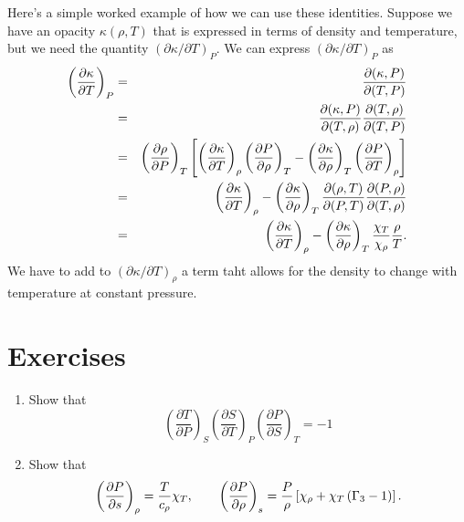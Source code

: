 Here's a simple worked example of how we can use these identities.  Suppose we have an opacity $\kappa(\rho,T)$ that is expressed in terms of density and temperature, but we need the quantity $(\partial \kappa/\partial T)_{P}$. We can express $(\partial\kappa/\partial T)_{P}$ as
\begin{eqnarray}
\left(\frac{\partial \kappa}{\partial T}\right)_{P} &=& \frac{\partial(\kappa,P)}{\partial(T,P)}\nonumber\\
 &=& \frac{\partial(\kappa,P)}{\partial(T,\rho)}\frac{\partial(T,\rho)}{\partial(T,P)}\nonumber\\
 &=& \left(\frac{\partial \rho}{\partial P}\right)_{T}\left[\left(\frac{\partial \kappa}{\partial T}\right)_{\rho}\left(\frac{\partial P}{\partial \rho}\right)_{T}-\left(\frac{\partial \kappa}{\partial \rho}\right)_{T}\left(\frac{\partial P}{\partial T}\right)_{\rho}\right]
 \nonumber\\
 &=& \left(\frac{\partial \kappa}{\partial T}\right)_{\rho} - \left(\frac{\partial \kappa}{\partial \rho}\right)_{T}\frac{\partial(\rho,T)}{\partial(P,T)}\frac{\partial(P,\rho)}{\partial(T,\rho)}\nonumber\\
 &=& \left(\frac{\partial \kappa}{\partial T}\right)_{\rho} - \left(\frac{\partial \kappa}{\partial \rho}\right)_{T} \frac{\chi_{T}}{\chi_{\rho}}\frac{\rho}{T}.
\end{eqnarray}
We have to add to $(\partial \kappa/\partial T)_{\rho}$ a term taht allows for the density to change with temperature at constant pressure.

\section{Exercises}\label{s.thermo-exercises}
\begin{enumerate}
\item Show that 
\[
 	\left(\frac{\partial T}{\partial P}\right)_{S} 
 	\left(\frac{\partial S}{\partial T}\right)_{P} 
 	\left(\frac{\partial P}{\partial S}\right)_{T} = -1
\]

\item \label{ex.gamma-trans} Show that
\[ 
\left(\frac{\partial P}{\partial s}\right)_{\rho} = \frac{T}{c_{\rho}}\chi_{T},\qquad \left(\frac{\partial P}{\partial \rho}\right)_{s} = \frac{P}{\rho}\left[\chi_{\rho} + \chi_{T}\left(\Gamma_{3}-1\right)\right].
\]
\end{enumerate}
